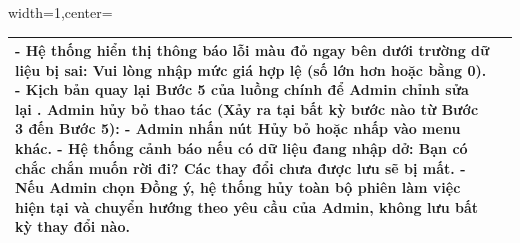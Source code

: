 \begin{adjustbox}{width=1\textwidth,center=\textwidth}
\begin{tabular}{|>{\centering\arraybackslash}m{3.5cm}|m{13.2cm}|}
- Hệ thống hiển thị thông báo lỗi màu đỏ ngay bên dưới trường dữ liệu bị sai: Vui lòng nhập mức giá hợp lệ (số lớn hơn hoặc bằng 0). \newline
- Kịch bản quay lại Bước 5 của luồng chính để Admin chỉnh sửa lại \newline
2. Admin hủy bỏ thao tác (Xảy ra tại bất kỳ bước nào từ Bước 3 đến Bước 5): \newline
- Admin nhấn nút Hủy bỏ hoặc nhấp vào menu khác. \newline
- Hệ thống cảnh báo nếu có dữ liệu đang nhập dở: Bạn có chắc chắn muốn rời đi? Các thay đổi chưa được lưu sẽ bị mất. \newline
- Nếu Admin chọn Đồng ý, hệ thống hủy toàn bộ phiên làm việc hiện tại và chuyển hướng theo yêu cầu của Admin, không lưu bất kỳ thay đổi nào.\\ \hline
\end{tabular}
\end{adjustbox}

